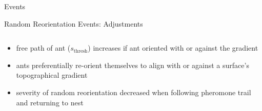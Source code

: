 \begin{subsection}{Events}
\begin{frame}{Random Reorientation Events: Adjustments}
\begin{columns}[T,onlytextwidth]
\end{columns}
\begin{itemize}
  \item free path of ant ($s_{\operatorname{thresh}}$) increases if ant oriented with or against the gradient {\scriptsize\cite{khuong_how_2013}}
  \item ants preferentially re-orient themselves to align with or against a surface's topographical gradient {\scriptsize\cite{khuong_how_2013}}
	\item severity of random reorientation decreased when following pheromone trail and returning to nest
\end{itemize}
\end{frame}




\end{subsection}
